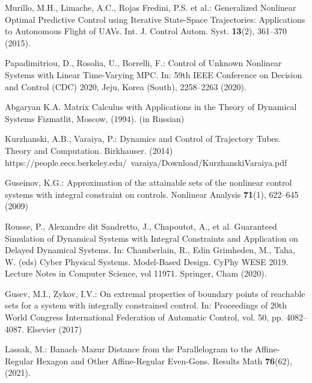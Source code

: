 \documentclass[../main.tex]{subfiles}
\begin{document}
\begin{thebibliography}{99}
Murillo, M.H., Limache, A.C., Rojas Fredini, P.S. et al.: Generalized Nonlinear Optimal Predictive Control using Iterative State-Space
Trajectories: Applications to Autonomous Flight of UAVs. Int. J. Control Autom. Syst. \textbf{13}(2), 361--370 (2015).

Papadimitriou, D., Rosolia, U., Borrelli, F.: Control of Unknown Nonlinear Systems with Linear Time-Varying MPC. In: 59th IEEE Conference on Decision and Control (CDC) 2020, Jeju, Korea (South), 2258--2263 (2020). 


Abgaryan K.A. Matrix Calculus with Applications in the Theory of Dynamical Systems Fizmatlit, Moscow, (1994). (in Russian)

Kurzhanski, A.B., Varaiya, P.: Dynamics and Control of Trajectory Tubes. Theory and Computation. Birkhauser. (2014)\\ https://people.eecs.berkeley.edu/~varaiya/Download/KurzhanskiVaraiya.pdf

Guseinov, K.G.: Approximation of the attainable sets of the nonlinear control systems with integral constraint on controls. Nonlinear Analysis \textbf{71}(1), 622--645 (2009) 

Rousse, P., Alexandre dit Sandretto, J., Chapoutot, A., et al. Guaranteed Simulation of Dynamical Systems with Integral Constraints and Application on Delayed Dynamical Systems. In: Chamberlain, R., Edin Grimheden, M., Taha, W. (eds) Cyber Physical Systems. Model-Based Design. CyPhy WESE 2019. Lecture Notes in Computer Science, vol 11971. Springer, Cham (2020). 

Gusev, M.I., Zykov, I.V.: On extremal properties of boundary points of reachable sets for a system with integrally constrained control. In: Proceedings of 20th World Congress International Federation of Automatic Control, vol. 50, pp. 4082--4087. Elsevier (2017) 

Lassak, M.: Banach–Mazur Distance from the Parallelogram to the Affine-Regular Hexagon and Other Affine-Regular Even-Gons. Results Math \textbf{76}(62), (2021). 


\end{thebibliography}
\end{document}
